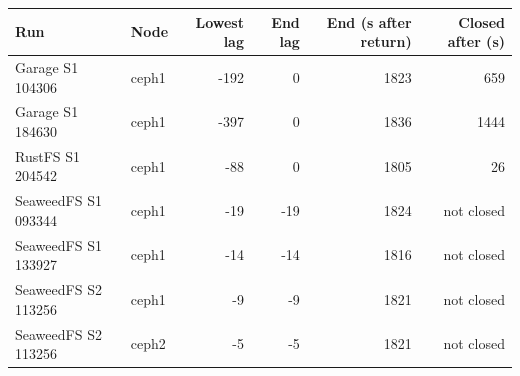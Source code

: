 \begin{tabular}{llrrrr}
\toprule
Run & Node & Lowest lag & End lag & End (s after return) & Closed after (s) \\
\midrule
Garage S1 104306 & ceph1 & -192 & 0 & 1823 & 659 \\
Garage S1 184630 & ceph1 & -397 & 0 & 1836 & 1444 \\
\midrule
RustFS S1 204542 & ceph1 & -88 & 0 & 1805 & 26 \\
\midrule
SeaweedFS S1 093344 & ceph1 & -19 & -19 & 1824 & not closed \\
SeaweedFS S1 133927 & ceph1 & -14 & -14 & 1816 & not closed \\
SeaweedFS S2 113256 & ceph1 & -9 & -9 & 1821 & not closed \\
SeaweedFS S2 113256 & ceph2 & -5 & -5 & 1821 & not closed \\
\bottomrule
\end{tabular}
